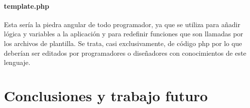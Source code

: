 \paragraph{template.php}
\par Esta sería la piedra angular de todo programador, ya que se utiliza para añadir lógica y variables a la aplicación y para redefinir funciones que son llamadas por los archivos de plantilla. Se trata, casi exclusivamente, de código php por lo que deberían ser editados por programadores o diseñadores con conocimientos de este lenguaje.




\section{Conclusiones y trabajo futuro}


